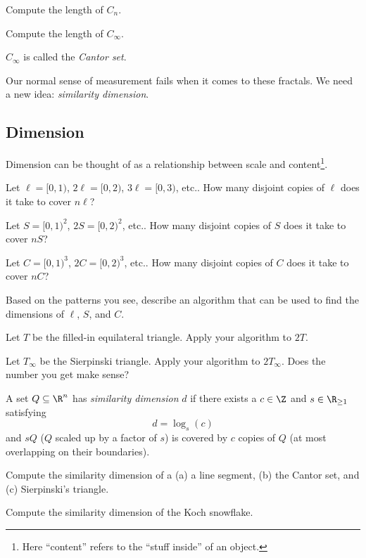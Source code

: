 	\begin{parts}
		\item Compute the length of $C_n$.
		\item Compute the length of $C_\infty$.
	\end{parts}
	$C_\infty$ is called the \emph{Cantor set}.


	\bigskip
	Our normal sense of measurement fails when it comes to these fractals. We need a new idea: \emph{similarity dimension}.

	\newpage
	\subsection*{Dimension}

	Dimension can be thought of as a relationship between scale and content\footnote{Here ``content'' refers to the ``stuff inside'' of an object.}.

	\question
	\begin{parts}
		\item 
		Let $\ell=[0,1)$, $2\ell=[0,2)$, $3\ell=[0,3)$, etc.. How many disjoint copies of $\ell$ does it take to
		cover $n\ell$?
		\item Let $S=[0,1)^2$, $2S=[0,2)^2$, etc.. How many disjoint copies of $S$ does it take to cover $nS$?
		\item Let $C=[0,1)^3$, $2C=[0,2)^3$, etc.. How many disjoint copies of $C$ does it take to cover $nC$?
		\item Based on the patterns you see, describe an algorithm that can be used to find the dimensions of $\ell$, $S$, and
			$C$.
		\item Let $T$ be the filled-in equilateral triangle. Apply your algorithm to $2T$.
		\item Let $T_\infty$ be the Sierpinski triangle. Apply your algorithm to $2T_\infty$. Does the number you get
			make sense?
	\end{parts}

	\begin{definition}
		A set $Q\subseteq \R^n$ has \emph{similarity dimension} $d$ if there exists a $c\in \Z$
		and $s\in \R_{\geq 1}$ satisfying
		\[
			d=\log_s(c)
		\]
		and $sQ$ ($Q$ scaled up by a factor of $s$) is covered by
		$c$ copies of $Q$ (at most overlapping on their boundaries).

	\end{definition}

	\question
	\begin{parts}
		\item Compute the similarity dimension of a (a) a line segment, (b) the Cantor set, and (c) Sierpinski's triangle.
		\item Compute the similarity dimension of the Koch snowflake.
	\end{parts}

